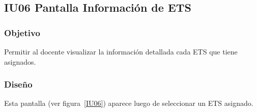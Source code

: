\subsection{IU06 Pantalla Información de ETS}

\newpage

\subsubsection{Objetivo}
Permitir al docente visualizar la información detallada cada ETS que tiene asignados.

\subsubsection{Diseño}
Esta pantalla  (ver figura~\ref{IU06}) aparece luego de seleccionar un ETS asignado.



